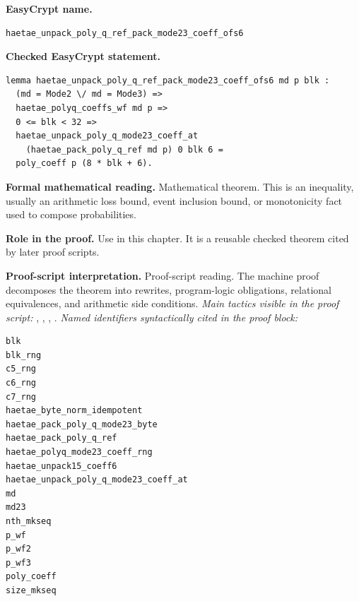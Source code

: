 \begin{formaltheorem}
\noindent\textbf{EasyCrypt name.}
\begin{lstlisting}[language=EasyCrypt,basicstyle=\ttfamily\scriptsize]
haetae_unpack_poly_q_ref_pack_mode23_coeff_ofs6
\end{lstlisting}
\noindent\textbf{Checked EasyCrypt statement.}
\begin{lstlisting}[language=EasyCrypt,basicstyle=\ttfamily\scriptsize]
lemma haetae_unpack_poly_q_ref_pack_mode23_coeff_ofs6 md p blk :
  (md = Mode2 \/ md = Mode3) =>
  haetae_polyq_coeffs_wf md p =>
  0 <= blk < 32 =>
  haetae_unpack_poly_q_mode23_coeff_at
    (haetae_pack_poly_q_ref md p) 0 blk 6 =
  poly_coeff p (8 * blk + 6).
\end{lstlisting}
\noindent\textbf{Formal mathematical reading.}
Mathematical theorem. This is an inequality, usually an arithmetic loss bound, event inclusion bound, or monotonicity fact used to compose probabilities.

\noindent\textbf{Role in the proof.}
Use in this chapter. It is a reusable checked theorem cited by later proof scripts.

\noindent\textbf{Proof-script interpretation.}
Proof-script reading. The machine proof decomposes the theorem into rewrites, program-logic obligations, relational equivalences, and arithmetic side conditions.
\emph{Main tactics visible in the proof script:} , , , .
\emph{Named identifiers syntactically cited in the proof block:}
\begin{lstlisting}[language=EasyCrypt,basicstyle=\ttfamily\scriptsize]
blk
blk_rng
c5_rng
c6_rng
c7_rng
haetae_byte_norm_idempotent
haetae_pack_poly_q_mode23_byte
haetae_pack_poly_q_ref
haetae_polyq_mode23_coeff_rng
haetae_unpack15_coeff6
haetae_unpack_poly_q_mode23_coeff_at
md
md23
nth_mkseq
p_wf
p_wf2
p_wf3
poly_coeff
size_mkseq
\end{lstlisting}

\end{formaltheorem}

